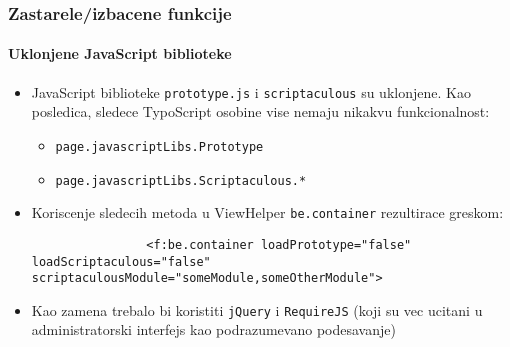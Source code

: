 \begin{frame}[fragile]
	\frametitle{Zastarele/izbacene funkcije}
	\framesubtitle{Uklonjene JavaScript biblioteke}

	\begin{itemize}

		\item JavaScript biblioteke \texttt{prototype.js} i \texttt{scriptaculous} su uklonjene.
			Kao posledica, sledece TypoScript osobine vise nemaju nikakvu funkcionalnost:

			\begin{itemize}
				\item \texttt{page.javascriptLibs.Prototype}
				\item \texttt{page.javascriptLibs.Scriptaculous.*}
			\end{itemize}

		\item Koriscenje sledecih metoda u ViewHelper \texttt{be.container} rezultirace greskom:
			\begin{lstlisting}
				<f:be.container loadPrototype="false" loadScriptaculous="false" scriptaculousModule="someModule,someOtherModule">
			\end{lstlisting}

		\item Kao zamena trebalo bi koristiti \texttt{jQuery} i \texttt{RequireJS}\newline
			(koji su vec ucitani u administratorski interfejs kao podrazumevano podesavanje)

	\end{itemize}

\end{frame}


